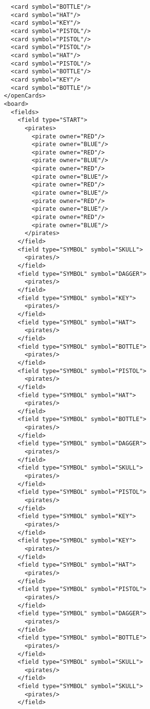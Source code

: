 \documentclass[12pt,a4paper, ngerman, oneside]{scrartcl}
\begin{document}
\begin{enumerate}
\begin{verbatim}
        <card symbol="BOTTLE"/>
        <card symbol="HAT"/>
        <card symbol="KEY"/>
        <card symbol="PISTOL"/>
        <card symbol="PISTOL"/>
        <card symbol="PISTOL"/>
        <card symbol="HAT"/>
        <card symbol="PISTOL"/>
        <card symbol="BOTTLE"/>
        <card symbol="KEY"/>
        <card symbol="BOTTLE"/>
      </openCards>
      <board>
        <fields>
          <field type="START">
            <pirates>
              <pirate owner="RED"/>
              <pirate owner="BLUE"/>
              <pirate owner="RED"/>
              <pirate owner="BLUE"/>
              <pirate owner="RED"/>
              <pirate owner="BLUE"/>
              <pirate owner="RED"/>
              <pirate owner="BLUE"/>
              <pirate owner="RED"/>
              <pirate owner="BLUE"/>
              <pirate owner="RED"/>
              <pirate owner="BLUE"/>
            </pirates>
          </field>
          <field type="SYMBOL" symbol="SKULL">
            <pirates/>
          </field>
          <field type="SYMBOL" symbol="DAGGER">
            <pirates/>
          </field>
          <field type="SYMBOL" symbol="KEY">
            <pirates/>
          </field>
          <field type="SYMBOL" symbol="HAT">
            <pirates/>
          </field>
          <field type="SYMBOL" symbol="BOTTLE">
            <pirates/>
          </field>
          <field type="SYMBOL" symbol="PISTOL">
            <pirates/>
          </field>
          <field type="SYMBOL" symbol="HAT">
            <pirates/>
          </field>
          <field type="SYMBOL" symbol="BOTTLE">
            <pirates/>
          </field>
          <field type="SYMBOL" symbol="DAGGER">
            <pirates/>
          </field>
          <field type="SYMBOL" symbol="SKULL">
            <pirates/>
          </field>
          <field type="SYMBOL" symbol="PISTOL">
            <pirates/>
          </field>
          <field type="SYMBOL" symbol="KEY">
            <pirates/>
          </field>
          <field type="SYMBOL" symbol="KEY">
            <pirates/>
          </field>
          <field type="SYMBOL" symbol="HAT">
            <pirates/>
          </field>
          <field type="SYMBOL" symbol="PISTOL">
            <pirates/>
          </field>
          <field type="SYMBOL" symbol="DAGGER">
            <pirates/>
          </field>
          <field type="SYMBOL" symbol="BOTTLE">
            <pirates/>
          </field>
          <field type="SYMBOL" symbol="SKULL">
            <pirates/>
          </field>
          <field type="SYMBOL" symbol="SKULL">
            <pirates/>
          </field>

\end{verbatim}
\end{enumerate}
\end{document}
